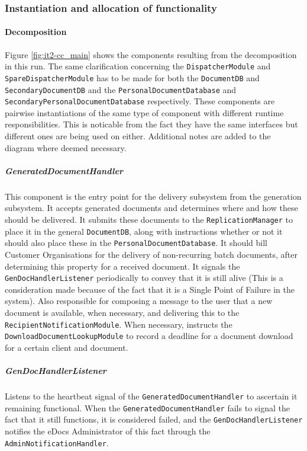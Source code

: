 \documentclass[a4paper,10pt]{article}
\begin{document}
\subsubsection{Instantiation and allocation of functionality}
\paragraph{Decomposition}
Figure \ref{fig:it2-cc_main} shows the components resulting from the decomposition in this run. The same clarification concerning the \texttt{DispatcherModule} and \texttt{SpareDispatcherModule} has to be made for both the \texttt{DocumentDB} and \texttt{SecondaryDocumentDB} and the \texttt{PersonalDocumentDatabase} and \texttt{SecondaryPersonalDocumentDatabase} respectively. These components are pairwise instantiations of the same type of component with different runtime responsibilities. This is noticable from the fact they have the same interfaces but different ones are being used on either. Additional notes are added to the diagram where deemed necessary.

\subparagraph{GeneratedDocumentHandler}
This component is the entry point for the delivery subsystem from the generation subsystem. It accepts generated documents and determines where and how these should be delivered. It submits these documents to the \texttt{ReplicationManager} to place it in the general \texttt{DocumentDB}, along with instructions whether or not it should also place these in the \texttt{PersonalDocumentDatabase}. It should bill Customer Organisations for the delivery of non-recurring batch documents, after determining this property for a received document. It signals the \texttt{GenDocHandlerListener} periodically to convey that it is still alive (This is a consideration made because of the fact that it is a Single Point of Failure in the system). Also responsible for composing a message to the user that a new document is available, when necessary, and delivering this to the \texttt{RecipientNotificationModule}. When necessary, instructs the \texttt{DownloadDocumentLookupModule} to record a deadline for a document download for a certain client and document.

\subparagraph{GenDocHandlerListener}
Listens to the heartbeat signal of the \texttt{GeneratedDocumentHandler} to ascertain it remaining functional. When the \texttt{GeneratedDocumentHandler} fails to signal the fact that it still functions, it is considered failed, and the \texttt{GenDocHandlerListener} notifies the eDocs Administrator of this fact through the \texttt{AdminNotificationHandler}.
\end{document}
